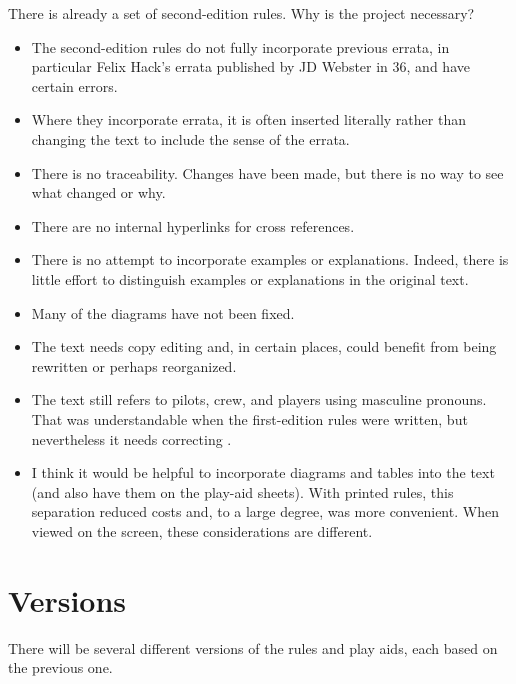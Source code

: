\documentclass[10pt]{article}
\begin{document}
There is already a set of second-edition rules. Why is the project necessary?
\begin{itemize}
    \item The second-edition rules do not fully incorporate previous errata, in particular Felix Hack's errata published by JD Webster in {\APJ} 36, and have certain errors.
    \item Where they incorporate errata, it is often inserted literally rather than changing the text to include the sense of the errata.
    \item There is no traceability. Changes have been made, but there is no way to see what changed or why.
    \item There are no internal hyperlinks for cross references.
    \item There is no attempt to incorporate examples or explanations. Indeed, there is little effort to distinguish examples or explanations in the original text.
    \item Many of the diagrams have not been fixed.
    \item The text needs copy editing and, in certain places, could benefit from being rewritten or perhaps reorganized.
    \item The text still refers to pilots, crew, and players using masculine pronouns. That was understandable when the first-edition rules were written, but nevertheless it needs correcting .
    \item I think it would be helpful to incorporate diagrams and tables into the text (and also have them on the play-aid sheets). With printed rules, this separation reduced costs and, to a large degree, was more convenient. When viewed on the screen, these considerations are different.
\end{itemize}

\section*{Versions}

There will be several different versions of the rules and play aids, each based on the previous one.
\end{document}

